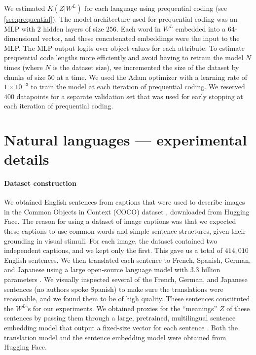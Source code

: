 \documentclass{article}
\begin{document}
\begin{appendices}
We estimated $K(Z|W^L)$ for each language using prequential coding (see \cref{sec:prequential}). The model architecture used for prequential coding was an MLP with $2$ hidden layers of size $256$. Each word in $W^L$ embedded into a $64$-dimensional vector, and these concatenated embeddings were the input to the MLP. The MLP output logits over object values for each attribute. To estimate prequential code lengths more efficiently and avoid having to retrain the model $N$ times (where $N$ is the dataset size), we incremented the size of the dataset by chunks of size $50$ at a time. We used the Adam optimizer with a learning rate of $1 \times 10^{-3}$ to train the model at each iteration of prequential coding. We reserved $400$ datapoints for a separate validation set that was used for early stopping at each iteration of prequential coding.


\section{Natural languages --- experimental details}
\label{sec:natural_details}

\paragraph{Dataset construction}

We obtained English sentences from captions that were used to describe images in the Common Objects in Context (COCO) dataset \citep{coco-captions}, downloaded from Hugging Face. The reason for using a dataset of image captions was that we expected these captions to use common words and simple sentence structures, given their grounding in visual stimuli. For each image, the dataset contained two independent captions, and we kept only the first. This gave us a total of $414,010$ English sentences. We then translated each sentence to French, Spanish, German, and Japanese using a large open-source language model with 3.3 billion parameters \citep{costa2022no}. We visually inspected several of the French, German, and Japanese sentences (no authors spoke Spanish) to make sure the translations were reasonable, and we found them to be of high quality. These sentences constituted the $W^L$'s for our experiments. We obtained proxies for the ``meanings'' $Z$ of these sentences by passing them through a large, pretrained, multilingual sentence embedding model that output a fixed-size vector for each sentence \citep{reimers-2020-multilingual-sentence-bert}. Both the translation model and the sentence embedding model were obtained from Hugging Face.


\end{appendices}
\end{document}
